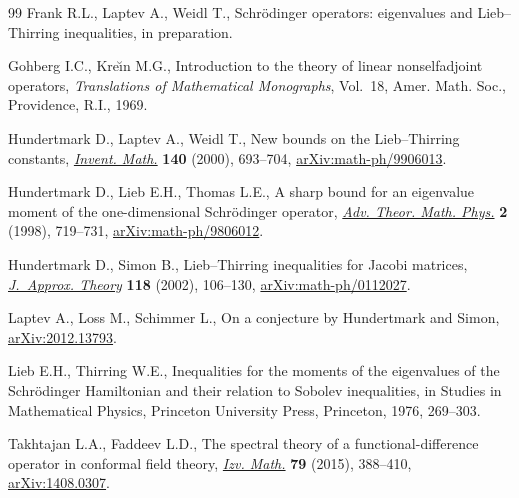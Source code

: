 \documentclass[11pt]{article}
\numberwithin{equation}{section}
\numberwithin{equation}{section}
\begin{document}
\begin{thebibliography}{99}
Frank R.L., Laptev A., Weidl T., Schr\"odinger operators: eigenvalues and
 {L}ieb--{T}hirring inequalities, {i}n preparation.

Gohberg I.C., Kre\u{\i}n M.G., Introduction to the theory of linear
 nonselfadjoint operators, \textit{Translations of Mathematical Monographs},
 Vol.~18, Amer. Math. Soc., Providence, R.I., 1969.

Hundertmark D., Laptev A., Weidl T., New bounds on the {L}ieb--{T}hirring
 constants, \href{https://doi.org/10.1007/s002220000077}{\textit{Invent. Math.}} \textbf{140} (2000), 693--704,
 \href{https://arxiv.org/abs/math-ph/9906013}{arXiv:math-ph/9906013}.

Hundertmark D., Lieb E.H., Thomas L.E., A sharp bound for an eigenvalue moment
 of the one-dimensional {S}chr\"odinger operator, \href{https://doi.org/10.4310/ATMP.1998.v2.n4.a2}{\textit{Adv. Theor. Math.
 Phys.}} \textbf{2} (1998), 719--731, \href{https://arxiv.org/abs/math-ph/9806012}{arXiv:math-ph/9806012}.

Hundertmark D., Simon B., Lieb--{T}hirring inequalities for {J}acobi matrices,
 \href{https://doi.org/10.1006/jath.2002.3704}{\textit{J.~Approx. Theory}} \textbf{118} (2002), 106--130, \href{https://arxiv.org/abs/math-ph/0112027}{arXiv:math-ph/0112027}.

Laptev A., Loss M., Schimmer L., On a conjecture by {H}undertmark and {S}imon,
 \href{https://arxiv.org/abs/2012.13793}{arXiv:2012.13793}.

Lieb E.H., Thirring W.E., Inequalities for the moments of the eigenvalues of
 the {S}chr\"odinger {H}amiltonian and their relation to {S}obolev
 inequalities, in Studies in Mathematical Physics, Princeton University Press,
 Princeton, 1976, 269--303.

Takhtajan L.A., Faddeev L.D., The spectral theory of a functional-difference
 operator in conformal field theory, \href{https://doi.org/10.1070/IM2015v079n02ABEH002747}{\textit{Izv. Math.}} \textbf{79} (2015),
 388--410, \href{https://arxiv.org/abs/1408.0307}{arXiv:1408.0307}.

\end{thebibliography}
\end{document}
